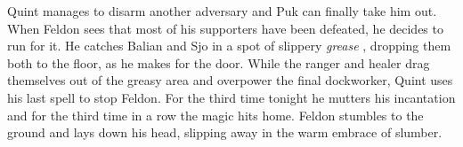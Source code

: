 Quint manages to disarm another adversary and Puk can finally take him out. When Feldon sees that most of his supporters have been defeated, he decides to run for it. He catches Balian and Sjo in a spot of slippery {\itshape grease} , dropping them both to the floor, as he makes for the door. While the ranger and healer drag themselves out of the greasy area and overpower the final dockworker, Quint uses his last spell to stop Feldon. For the third time tonight he mutters his incantation and for the third time in a row the magic hits home. Feldon stumbles to the ground and lays down his head, slipping away in the warm embrace of slumber. 